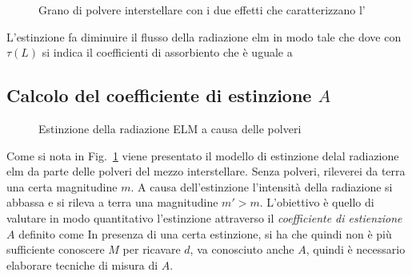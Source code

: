 \begin{figure}
		\centering
		\caption{Grano di polvere interstellare con i due effetti che caratterizzano l'}
\end{figure}
L'estinzione fa diminuire il flusso della radiazione elm in modo tale che
dove con $\tau(L)$ si indica il coefficienti di assorbiento che \`e uguale a
\subsection{Calcolo del coefficiente di estinzione $A$}
\begin{figure}
		\centering
		\caption{Estinzione della radiazione ELM a causa delle polveri}
		\label{Esti}
\end{figure}
Come si nota in Fig.~\ref{Esti} viene presentato il modello di estinzione delal radiazione elm da parte delle polveri del mezzo interstellare. Senza polveri, rileverei da terra una certa magnitudine $m$. A causa dell'estinzione l'intensit\`a della radiazione si abbassa e si rileva a terra una magnitudine $m'>m$. L'obiettivo \`e quello di valutare in modo quantitativo l'estinzione attraverso il \emph{coefficiente di estienzione} $A$ definito come
In presenza di una certa estinzione, si ha che
quindi non \`e pi\`u sufficiente conoscere $M$ per ricavare $d$, va conosciuto anche $A$, quindi \`e necessario elaborare tecniche di misura di $A$.

